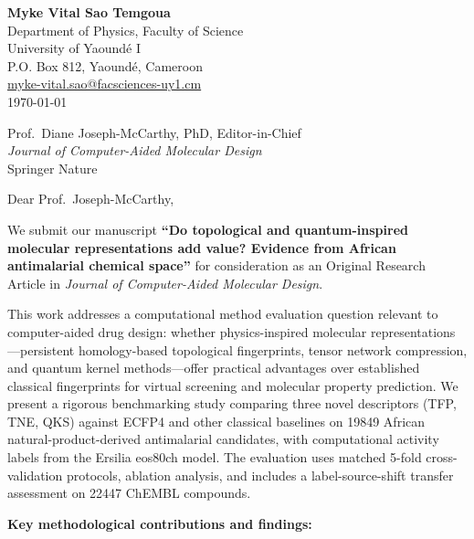 \documentclass[9pt,a4paper]{article}
\begin{document}
\fontsize{9}{10.5}\selectfont

\begin{flushleft}
\textbf{Myke Vital Sao Temgoua} \\
Department of Physics, Faculty of Science \\
University of Yaound\'{e} I \\
P.O. Box 812, Yaound\'{e}, Cameroon \\
\href{mailto:myke-vital.sao@facsciences-uy1.cm}{myke-vital.sao@facsciences-uy1.cm} \\[0.8em]
\today
\end{flushleft}

\begin{flushleft}
Prof.\ Diane Joseph-McCarthy, PhD, Editor-in-Chief \\
\textit{Journal of Computer-Aided Molecular Design} \\
Springer Nature
\end{flushleft}

\vspace{0.2em}

\noindent Dear Prof.\ Joseph-McCarthy,

We submit our manuscript \textbf{``Do topological and quantum-inspired molecular representations add value? Evidence from African antimalarial chemical space''} for consideration as an Original Research Article in \textit{Journal of Computer-Aided Molecular Design}.

This work addresses a computational method evaluation question relevant to computer-aided drug design: whether physics-inspired molecular representations—persistent homology-based topological fingerprints, tensor network compression, and quantum kernel methods—offer practical advantages over established classical fingerprints for virtual screening and molecular property prediction. We present a rigorous benchmarking study comparing three novel descriptors (TFP, TNE, QKS) against ECFP4 and other classical baselines on \num{19849} African natural-product-derived antimalarial candidates, with computational activity labels from the Ersilia eos80ch model. The evaluation uses matched 5-fold cross-validation protocols, ablation analysis, and includes a label-source-shift transfer assessment on \num{22447} ChEMBL compounds.

\noindent\textbf{Key methodological contributions and findings:}
\end{document}
